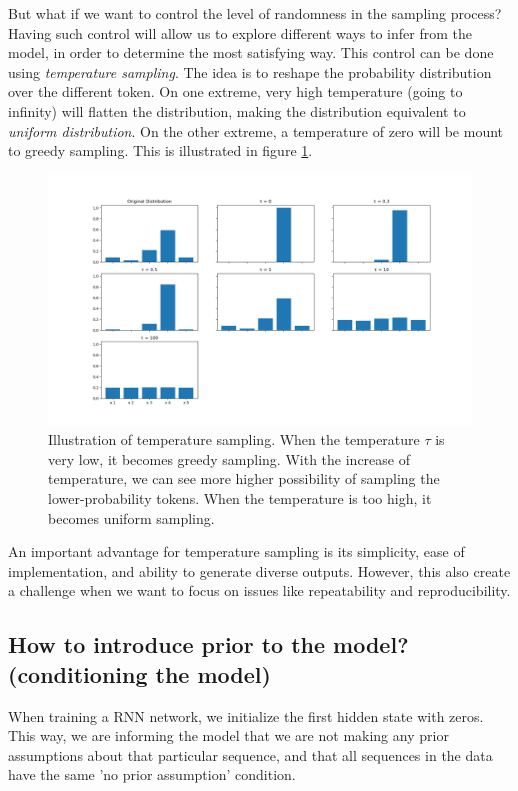 \par But what if we want to control the level of randomness in the sampling process? Having such control will allow us to explore different ways to infer from the model, in order to determine the most satisfying way. This control can be done using \textit{temperature sampling}. The idea is to reshape the probability distribution over the different token. On one extreme, very high temperature (going to infinity) will flatten the distribution, making the distribution equivalent to \textit{uniform distribution}. On the other extreme, a temperature of zero will be mount to greedy sampling. This is illustrated in figure \ref{fig:temperature_sampling}.

\begin{figure}
    \centering
    \includegraphics[scale=0.5]{images/gbem/temperature_sampling.png}
    \caption{Illustration of temperature sampling. When the temperature $\tau$ is very low, it becomes greedy sampling. With the increase of temperature, we can see more higher possibility of sampling the lower-probability tokens. When the temperature is too high, it becomes uniform sampling.}
    \label{fig:temperature_sampling}
\end{figure}

\par An important advantage for temperature sampling is its simplicity, ease of implementation, and ability to generate diverse outputs. However, this also create a challenge when we want to focus on issues like repeatability and reproducibility.

\subsection{How to introduce prior to the model? (conditioning the model)}
\par When training a RNN network, we initialize the first hidden state with zeros. This way, we are informing the model that we are not making any prior assumptions about that particular sequence, and that all sequences in the data have the same 'no prior assumption' condition.

